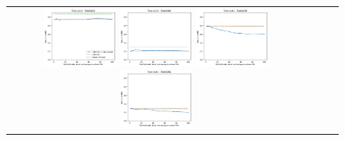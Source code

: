 \begin{figure}[h!]
\begin{tabular}{cccc}
  \includegraphics[width=0.25\textwidth]{Kap7/cw/train=b234_test=b261_rbf_individual_curves.png}  \includegraphics[width=0.25\textwidth]{Kap7/cw/train=b234_test=b360_rbf_individual_curves.png}
  \includegraphics[width=0.25\textwidth]{Kap7/cw/train=b261_test=b278_rbf_individual_curves.png}  \includegraphics[width=0.25\textwidth]{Kap7/cw/train=b261_test=b360_rbf_individual_curves.png} \\


\end{tabular}
\end{figure}
